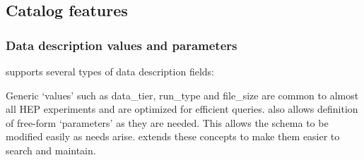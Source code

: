 

\subsection{Catalog features}

\subsubsection{Data description values and parameters}

  supports several types of data description fields:



  Generic `values' such as data\_tier, run\_type and file\_size  are common to almost all  HEP experiments and are optimized for efficient queries.   also allows definition of free-form `parameters' as they are needed.  This allows the schema to be modified easily as needs arise.   extends these concepts to make them easier to search and maintain. 







